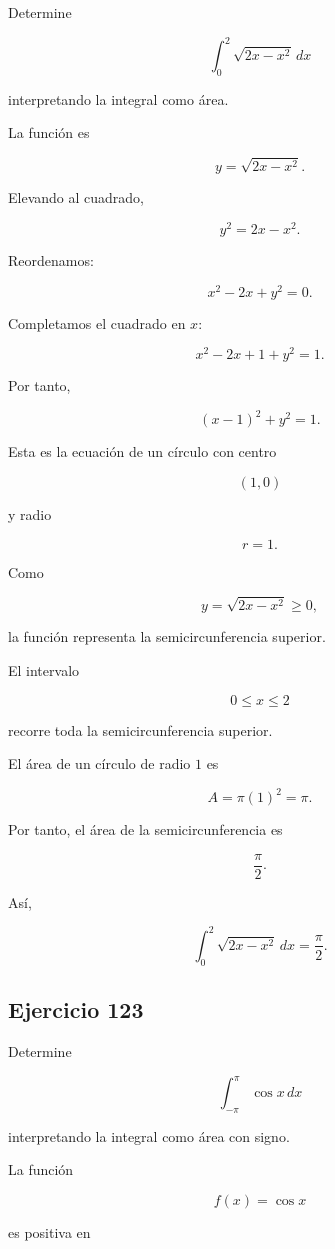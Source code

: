 \documentclass[12pt]{article}
\begin{document}
Determine

\[
\int_0^2\sqrt{2x-x^2}\,dx
\]

interpretando la integral como área.

La función es

\[
y=\sqrt{2x-x^2}.
\]

Elevando al cuadrado,

\[
y^2=2x-x^2.
\]

Reordenamos:

\[
x^2-2x+y^2=0.
\]

Completamos el cuadrado en \(x\):

\[
x^2-2x+1+y^2=1.
\]

Por tanto,

\[
(x-1)^2+y^2=1.
\]

Esta es la ecuación de un círculo con centro

\[
(1,0)
\]

y radio

\[
r=1.
\]

Como

\[
y=\sqrt{2x-x^2}\geq0,
\]

la función representa la semicircunferencia superior.

El intervalo

\[
0\leq x\leq2
\]

recorre toda la semicircunferencia superior.

El área de un círculo de radio \(1\) es

\[
A=\pi(1)^2=\pi.
\]

Por tanto, el área de la semicircunferencia es

\[
\frac{\pi}{2}.
\]

Así,

\[
\boxed{
\int_0^2\sqrt{2x-x^2}\,dx
=
\frac{\pi}{2}
}.
\]

\subsection*{Ejercicio 123}

Determine

\[
\int_{-\pi}^{\pi}\cos x\,dx
\]

interpretando la integral como área con signo.

La función

\[
f(x)=\cos x
\]

es positiva en
\end{document}
